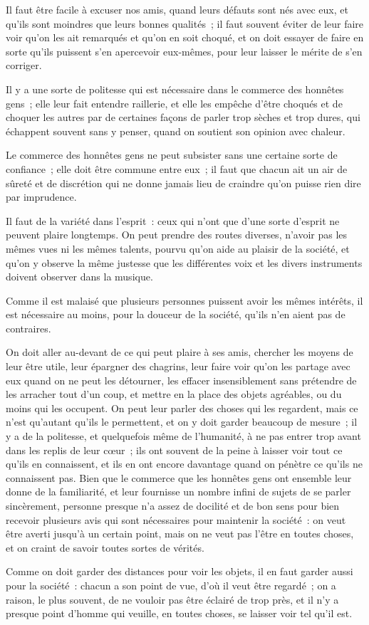 \documentclass[french,twoside]{book} %
\begin{document}
Il faut être facile à excuser nos amis, quand leurs défauts sont nés avec eux, et qu’ils sont moindres que leurs bonnes qualités ; il faut souvent éviter de leur faire voir qu’on les ait remarqués et qu’on en soit choqué, et on doit essayer de faire en sorte qu’ils puissent s’en apercevoir eux-mêmes, pour leur laisser le mérite de s’en corriger.\par
Il y a une sorte de politesse qui est nécessaire dans le commerce des honnêtes gens ; elle leur fait entendre raillerie, et elle les empêche d’être choqués et de choquer les autres par de certaines façons de parler trop sèches et trop dures, qui échappent souvent sans y penser, quand on soutient son opinion avec chaleur.\par
Le commerce des honnêtes gens ne peut subsister sans une certaine sorte de confiance ; elle doit être commune entre eux ; il faut que chacun ait un air de sûreté et de discrétion qui ne donne jamais lieu de craindre qu’on puisse rien dire par imprudence.\par
Il faut de la variété dans l’esprit : ceux qui n’ont que d’une sorte d’esprit ne peuvent plaire longtemps. On peut prendre des routes diverses, n’avoir pas les mêmes vues ni les mêmes talents, pourvu qu’on aide au plaisir de la société, et qu’on y observe la même justesse que les différentes voix et les divers instruments doivent observer dans la musique.\par
Comme il est malaisé que plusieurs personnes puissent avoir les mêmes intérêts, il est nécessaire au moins, pour la douceur de la société, qu’ils n’en aient pas de contraires.\par
On doit aller au-devant de ce qui peut plaire à ses amis, chercher les moyens de leur être utile, leur épargner des chagrins, leur faire voir qu’on les partage avec eux quand on ne peut les détourner, les effacer insensiblement sans prétendre de les arracher tout d’un coup, et mettre en la place des objets agréables, ou du moins qui les occupent. On peut leur parler des choses qui les regardent, mais ce n’est qu’autant qu’ils le permettent, et on y doit garder beaucoup de mesure ; il y a de la politesse, et quelquefois même de l’humanité, à ne pas entrer trop avant dans les replis de leur cœur ; ils ont souvent de la peine à laisser voir tout ce qu’ils en connaissent, et ils en ont encore davantage quand on pénètre ce qu’ils ne connaissent pas. Bien que le commerce que les honnêtes gens ont ensemble leur donne de la familiarité, et leur fournisse un nombre infini de sujets de se parler sincèrement, personne presque n’a assez de docilité et de bon sens pour bien recevoir plusieurs avis qui sont nécessaires pour maintenir la société : on veut être averti jusqu’à un certain point, mais on ne veut pas l’être en toutes choses, et on craint de savoir toutes sortes de vérités.\par
Comme on doit garder des distances pour voir les objets, il en faut garder aussi pour la société : chacun a son point de vue, d’où il veut être regardé ; on a raison, le plus souvent, de ne vouloir pas être éclairé de trop près, et il n’y a presque point d’homme qui veuille, en toutes choses, se laisser voir tel qu’il est.
\end{document}
